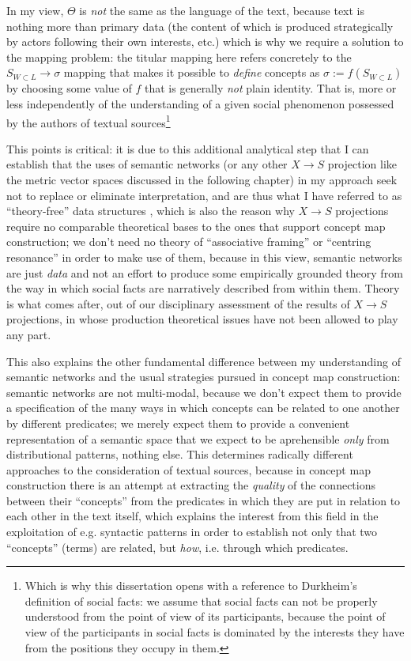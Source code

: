 In my view, $\Theta$ is \emph{not} the same as the language of the text, because text is nothing more than primary data (the content of which is produced strategically by actors following their own interests, etc.) which is why we require a solution to the mapping problem: the titular mapping here refers concretely to the $S_{W \subset L} \rightarrow \sigma$ mapping that makes it possible to \emph{define} concepts as $\sigma := f(S_{W \subset L})$ by choosing some value of $f$ that is generally \emph{not} plain identity.
That is, more or less independently of the understanding of a given social phenomenon possessed by the authors of textual sources\footnote{
    Which is why this dissertation opens with a reference to Durkheim's definition of social facts: we assume that social facts can not be properly understood from the point of view of its participants, because the point of view of the participants in social facts is dominated by the interests they have from the positions they occupy in them.
}

This points is critical: it is due to this additional analytical step that I can establish that the uses of semantic networks (or any other $X \rightarrow S$ projection like the metric vector spaces discussed in the following chapter) in my approach seek not to replace or eliminate interpretation, and are thus what I have referred to as ``theory-free'' data structures \citep{atria2016a,atria2016}, which is also the reason why $X \rightarrow S$ projections require no comparable theoretical bases to the ones that support concept map construction; we don't need no theory of ``associative framing'' or ``centring resonance'' in order to make use of them, because in this view, semantic networks are just \emph{data} and not an effort to produce some empirically grounded theory from the way in which social facts are narratively described from within them.
Theory is what comes after, out of our disciplinary assessment of the results of $X \rightarrow S$ projections, in whose production theoretical issues have not been allowed to play any part.

This also explains the other fundamental difference between my understanding of semantic networks and the usual strategies pursued in concept map construction: semantic networks are not multi-modal, because we don't expect them to provide a specification of the many ways in which concepts can be related to one another by different predicates; we merely expect them to provide a convenient representation of a semantic space that we expect to be aprehensible \emph{only} from distributional patterns, nothing else.
This determines radically different approaches to the consideration of textual sources, because in concept map construction there is an attempt at extracting the \emph{quality} of the connections between their ``concepts'' from the predicates in which they are put in relation to each other in the text itself, which explains the interest from this field in the exploitation of e.g. syntactic patterns in order to establish not only that two ``concepts'' (terms) are related, but \emph{how}, i.e. through which predicates.

